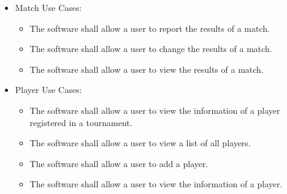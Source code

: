 \documentclass[11pt]{article}
\begin{document}
\begin{itemize}
        \item Match Use Cases:
        \begin{itemize}
            \item The software shall allow a user to report the results of a match.
            \item The software shall allow a user to change the results of a match.
            \item The software shall allow a user to view the results of a match.
        \end{itemize}
        
        \item Player Use Cases:
        \begin{itemize}
            \item The software shall allow a user to view the information of a player registered in a tournament.
            \item The software shall allow a user to view a list of all players.
            \item The software shall allow a user to add a player.
            \item The software shall allow a user to view the information of a player.
        \end{itemize}

    \end{itemize}
    
\end{document}
